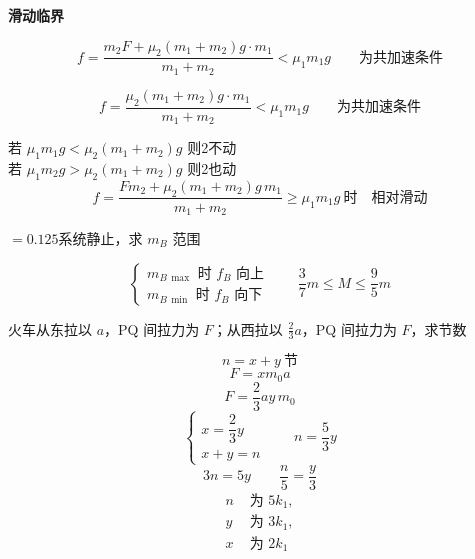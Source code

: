 \textbf{滑动临界}

\[ f=\frac{m_2F+\mu_2(m_1+m_2)g\cdot m_1}{m_1+m_2}<\mu_1m_1g\qquad\text{为共加速条件} \]

\[ f=\frac{\mu_2(m_1+m_2)g\cdot m_1}{m_1+m_2}<\mu_1m_1g\qquad\text{为共加速条件} \]


\noindent 若 $\mu_1m_1g<\mu_2(m_1+m_2)g$ 则2不动 \\
若 $\mu_1m_2g>\mu_2(m_1+m_2)g$ 则2也动 %
\[ f=\frac{Fm_2+\mu_2(m_1+m_2)g\,m_1}{m_1+m_2}\ge\mu_1m_1g\ \text{时}\quad\text{相对滑动} \]
\begin{problem}[1、]
\unclear{$\mu$}$=0.125$\quad 系统静止，求 $m_B$ 范围
\begin{solution}
\[ \begin{cases} m_{B\,\max}\text{ 时 }f_B\text{ 向上}\\[2pt] m_{B\,\min}\text{ 时 }f_B\text{ 向下}\end{cases}\qquad \frac37m\le M\le\frac95m \]
\end{solution}
\end{problem}
\begin{problem}[2、]
火车从东拉以 $a$，PQ 间拉力为 $F$；从西拉以 $\frac23a$，PQ 间拉力为 $F$，求节数
\begin{solution}
\[ n=x+y\ \text{节} \]
\[ F=xm_0a \]
\[ F=\frac23ay\,m_0 \]
\[ \begin{cases} x=\dfrac23y\\ x+y=n\end{cases}\qquad n=\frac53y \]
\[ 3n=5y\qquad \frac n5=\frac y3 \]
\[ \begin{aligned} n&\text{ 为 }5k_1,\\ y&\text{ 为 }3k_1,\\ x&\text{ 为 }2k_1\end{aligned} \]
\end{solution}
\end{problem}

